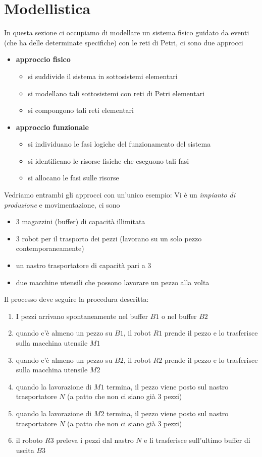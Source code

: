 \documentclass[10pt, letterpaper]{report}
\begin{document}
\section{Modellistica}
In questa sezione ci occupiamo di modellare un sistema fisico guidato da eventi (che ha delle determinate specifiche) con le reti di Petri, ci sono due approcci
\begin{itemize}
    \item \textbf{approccio fisico}\begin{itemize}
        \item 
     si suddivide il sistema in sottosistemi elementari
     \item  si modellano tali sottosistemi con reti di Petri elementari
     \item  si compongono tali reti elementari   \end{itemize}
     \item \textbf{approccio funzionale}\begin{itemize}
        \item si individuano le fasi logiche del funzionamento del sistema
        \item si identificano le risorse fisiche che eseguono tali fasi
        \item si allocano le fasi sulle risorse \end{itemize}
\end{itemize}
Vedriamo entrambi gli approcci con un'unico esempio: Vi è un \textit{impianto di produzione} e movimentazione, ci sono\begin{itemize}
    \item 3 magazzini (buffer) di capacità illimitata 
    \item 3 robot per il trasporto dei pezzi (lavorano su un solo pezzo contemporaneamente)
    \item un nastro trasportatore di capacità pari a 3 
    \item due macchine utensili che possono lavorare un pezzo alla volta 
\end{itemize}
Il processo deve seguire la procedura descritta:\begin{enumerate}
    \item I pezzi arrivano spontaneamente nel buffer $B1$ o nel buffer $B2$
    \item quando c'è almeno un pezzo su $B1$, il robot $R1$ prende il pezzo e lo trasferisce sulla macchina utensile $M1$
    \item quando c'è almeno un pezzo su $B2$, il robot $R2$ prende il pezzo e lo trasferisce sulla macchina utensile $M2$
    \item quando la lavorazione di $M1$ termina, il pezzo viene posto sul nastro trasportatore $N$ (a patto che non ci siano già 3 pezzi)
    \item quando la lavorazione di $M2$ termina, il pezzo viene posto sul nastro trasportatore $N$ (a patto che non ci siano già 3 pezzi)
    \item il roboto $R3$ preleva i pezzi dal nastro $N$ e li trasferisce sull'ultimo buffer di uscita $B3$
\end{enumerate}
\end{document}

